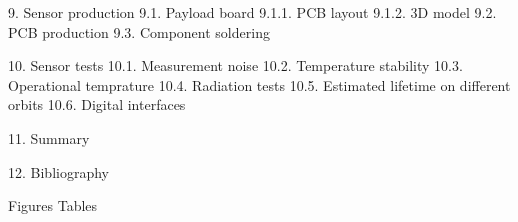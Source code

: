 \documentclass[pdflatex,en]{aghdpl}  %
\begin{document}
9. Sensor production
9.1. Payload board
9.1.1. PCB layout 
9.1.2. 3D model
9.2. PCB production
9.3. Component soldering

10. Sensor tests
10.1. Measurement noise
10.2. Temperature stability
10.3. Operational temprature
10.4. Radiation tests
10.5. Estimated lifetime on different orbits
10.6. Digital interfaces

11. Summary

12. Bibliography

Figures
Tables



% 
% 



%
%
%
%
\end{document}

